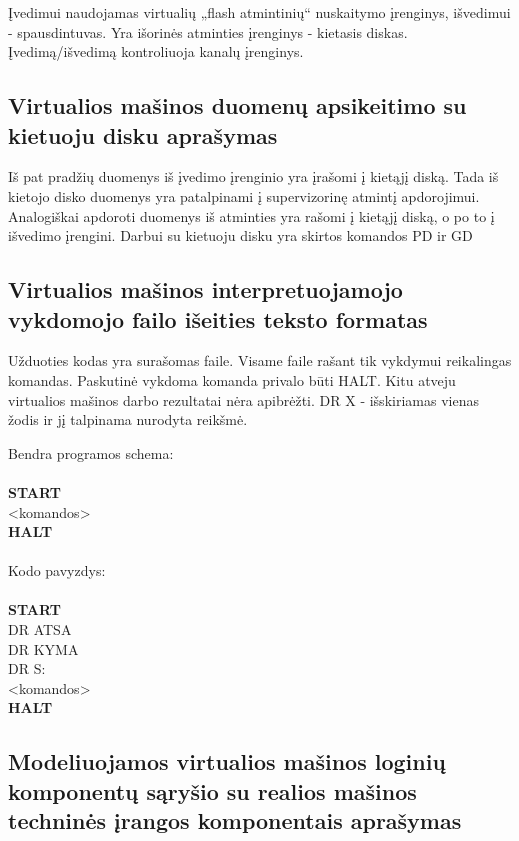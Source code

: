 Įvedimui naudojamas virtualių „flash atmintinių“ nuskaitymo įrenginys, išvedimui - spausdintuvas. Yra išorinės atminties įrenginys - kietasis diskas. Įvedimą/išvedimą kontroliuoja kanalų įrenginys.

\subsection{Virtualios mašinos duomenų apsikeitimo su kietuoju disku aprašymas}

Iš pat pradžių duomenys iš įvedimo įrenginio yra įrašomi į kietąjį diską. Tada iš kietojo disko duomenys yra patalpinami į supervizorinę atmintį apdorojimui. 
Analogiškai apdoroti duomenys iš atminties yra rašomi į kietąjį diską, o po to į išvedimo įrengini.
Darbui su kietuoju disku yra skirtos komandos PD ir GD

\subsection{Virtualios mašinos interpretuojamojo vykdomojo failo išeities 
teksto formatas}

Užduoties kodas yra surašomas faile. Visame faile rašant tik vykdymui reikalingas
komandas. Paskutinė vykdoma komanda privalo būti HALT. Kitu atveju virtualios mašinos darbo
rezultatai nėra apibrėžti.
DR X - išskiriamas vienas žodis ir jį talpinama nurodyta reikšmė.

Bendra programos schema:\\
\\\textbf{START}\\
<komandos>\\
\textbf{HALT}\\
\\
Kodo pavyzdys:\\
\\\textbf{START}\\
DR ATSA\\
DR KYMA\\
DR S:  \\


<komandos>\\
\textbf{HALT}

\subsection{Modeliuojamos virtualios mašinos loginių komponentų sąryšio su 
realios mašinos techninės įrangos komponentais aprašymas}


